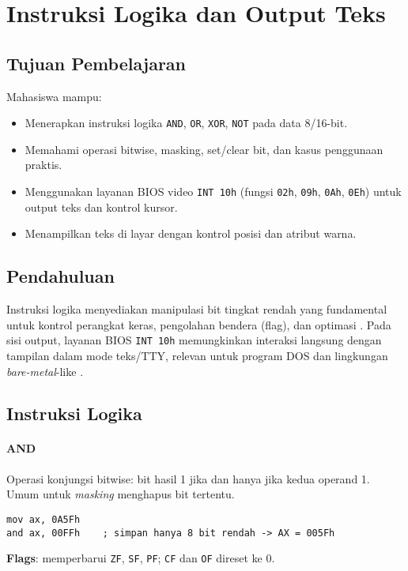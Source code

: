 \chapter{Instruksi Logika dan Output Teks}

\section{Tujuan Pembelajaran}
Mahasiswa mampu:
\begin{itemize}
    \item Menerapkan instruksi logika \texttt{AND}, \texttt{OR}, \texttt{XOR}, \texttt{NOT} pada data 8/16-bit.
    \item Memahami operasi bitwise, masking, set/clear bit, dan kasus penggunaan praktis.
    \item Menggunakan layanan BIOS video \texttt{INT 10h} (fungsi \texttt{02h}, \texttt{09h}, \texttt{0Ah}, \texttt{0Eh}) untuk output teks dan kontrol kursor.
    \item Menampilkan teks di layar dengan kontrol posisi dan atribut warna.
\end{itemize}

\section{Pendahuluan}
Instruksi logika menyediakan manipulasi bit tingkat rendah yang fundamental untuk kontrol perangkat keras, pengolahan bendera (flag), dan optimasi \cite{hyde2010art}. Pada sisi output, layanan BIOS \texttt{INT 10h} memungkinkan interaksi langsung dengan tampilan dalam mode teks/TTY, relevan untuk program DOS dan lingkungan \textit{bare-metal}-like \cite{susanto1995belajar}.

\section{Instruksi Logika}
\subsubsection{AND}
Operasi konjungsi bitwise: bit hasil 1 jika dan hanya jika kedua operand 1. Umum untuk \textit{masking} menghapus bit tertentu.
\begin{verbatim}
mov ax, 0A5Fh
and ax, 00FFh    ; simpan hanya 8 bit rendah -> AX = 005Fh
\end{verbatim}
\textbf{Flags}: memperbarui \texttt{ZF}, \texttt{SF}, \texttt{PF}; \texttt{CF} dan \texttt{OF} direset ke 0.

